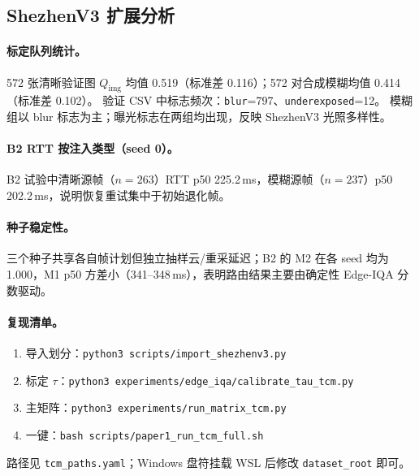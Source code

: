 \subsection{ShezhenV3 扩展分析}
\label{sec:extended-analysis-zh}

\paragraph{标定队列统计。}
572 张清晰验证图 $Q_{\mathrm{img}}$ 均值 0.519（标准差 0.116）；572 对合成模糊均值 0.414（标准差 0.102）。
验证 CSV 中标志频次：\texttt{blur}=797、\texttt{underexposed}=12。
模糊组以 blur 标志为主；曝光标志在两组均出现，反映 ShezhenV3 光照多样性。

\paragraph{B2 RTT 按注入类型（seed 0）。}
B2 试验中清晰源帧（$n=263$）RTT p50 225.2\,ms，模糊源帧（$n=237$）p50 202.2\,ms，说明恢复重试集中于初始退化帧。

\paragraph{种子稳定性。}
三个种子共享各自帧计划但独立抽样云/重采延迟；B2 的 M2 在各 seed 均为 1.000，M1 p50 方差小（341--348\,ms），表明路由结果主要由确定性 Edge-IQA 分数驱动。

\paragraph{复现清单。}
\begin{enumerate}
  \item 导入划分：\texttt{python3 scripts/import\_shezhenv3.py}
  \item 标定 $\tau$：\texttt{python3 experiments/edge\_iqa/calibrate\_tau\_tcm.py}
  \item 主矩阵：\texttt{python3 experiments/run\_matrix\_tcm.py}
  \item 一键：\texttt{bash scripts/paper1\_run\_tcm\_full.sh}
\end{enumerate}
路径见 \texttt{tcm\_paths.yaml}；Windows 盘符挂载 WSL 后修改 \texttt{dataset\_root} 即可。
